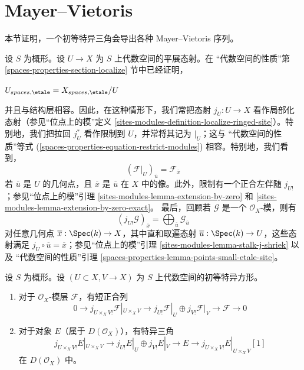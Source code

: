 \section{Mayer--Vietoris}
\label{section-mayer-vietoris}

\noindent
本节证明，一个初等特异三角会导出各种 Mayer--Vietoris 序列。 %

\medskip\noindent
设 $S$ 为概形。设 $U \to X$ 为 $S$ 上代数空间的平展态射。在
“代数空间的性质”第 \ref{spaces-properties-section-localize} 节中已经证明，

$U_{spaces, \etale} = X_{spaces, \etale}/U$

并且与结构层相容。因此，在这种情形下，我们常把态射 $j_U : U \to X$
看作局部化态射（参见“位点上的模”定义
\ref{sites-modules-definition-localize-ringed-site}）。特别地，我们把拉回
$j_U^*$ 看作限制到 $U$，并常将其记为 ${}|_U$；这与
“代数空间的性质”等式
(\ref{spaces-properties-equation-restrict-modules}) 相容。特别地，我们看到，
\begin{equation}
\label{equation-stalk-restriction}
(\mathcal{F}|_U)_{\overline{u}} = \mathcal{F}_{\overline{x}}
\end{equation}
若 $\overline{u}$ 是 $U$ 的几何点，且 $\overline{x}$ 是
$\overline{u}$ 在 $X$ 中的像。此外，限制有一个正合左伴随 $j_{U!}$；参见“位点上的模”引理
\ref{sites-modules-lemma-extension-by-zero} 和
\ref{sites-modules-lemma-extension-by-zero-exact}。
最后，回顾若 $\mathcal{G}$ 是一个 $\mathcal{O}_X$-模，则有
\begin{equation}
\label{equation-stalk-j-shriek}
(j_{U!}\mathcal{G})_{\overline{x}} =
\bigoplus\nolimits_{\overline{u}} \mathcal{G}_{\overline{u}}
\end{equation}
对任意几何点 $\overline{x} : \Spec(k) \to X$，其中直和取遍态射
$\overline{u} : \Spec(k) \to U$，这些态射满足 $j_U \circ \overline{u} = \overline{x}$；参见“位点上的模”引理
\ref{sites-modules-lemma-stalk-j-shriek} 以及
“代数空间的性质”引理
\ref{spaces-properties-lemma-points-small-etale-site}。

\begin{lemma}
\label{lemma-exact-sequence-lower-shriek}
设 $S$ 为概形。设 $(U \subset X, V \to X)$ 为 $S$ 上代数空间的初等特异方形。
\begin{enumerate}
\item 对于 $\mathcal{O}_X$-模层 $\mathcal{F}$，有短正合列
$$
0 \to j_{U \times_X V!}\mathcal{F}|_{U \times_X V} \to
j_{U!}\mathcal{F}|_U \oplus j_{V!}\mathcal{F}|_V \to \mathcal{F} \to 0
$$
\item 对于对象 $E$（属于 $D(\mathcal{O}_X)$），有特异三角
$$
j_{U \times_X V!}E|_{U \times_X V} \to
j_{U!}E|_U \oplus j_{V!}E|_V \to E \to
j_{U \times_X V!}E|_{U \times_X V}[1]
$$
在 $D(\mathcal{O}_X)$ 中。
\end{enumerate}
\end{lemma}

